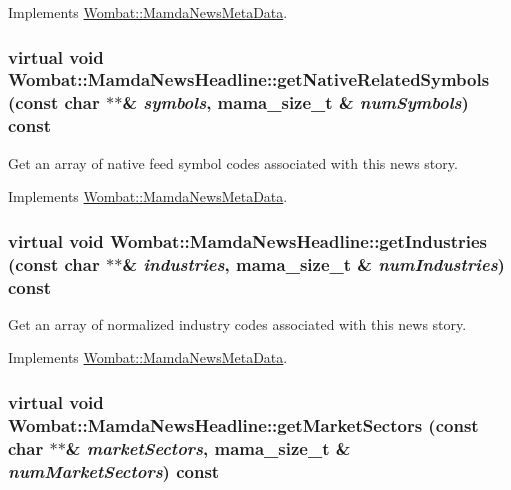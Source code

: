 Implements \hyperlink{classWombat_1_1MamdaNewsMetaData_2eee46712fbf04831baf811695678aeb}{Wombat::Mamda\-News\-Meta\-Data}.\hypertarget{classWombat_1_1MamdaNewsHeadline_35caf4a0f9aa24db2903ae45042200c1}{
\subsubsection[getNativeRelatedSymbols]{\setlength{\rightskip}{0pt plus 5cm}virtual void Wombat::Mamda\-News\-Headline::get\-Native\-Related\-Symbols (const char $\ast$$\ast$\& {\em symbols}, mama\_\-size\_\-t \& {\em num\-Symbols}) const}}
\label{classWombat_1_1MamdaNewsHeadline_35caf4a0f9aa24db2903ae45042200c1}


Get an array of native feed symbol codes associated with this news story. 



Implements \hyperlink{classWombat_1_1MamdaNewsMetaData_64e79bec2fd98b5669ea62bb9c51fec2}{Wombat::Mamda\-News\-Meta\-Data}.\hypertarget{classWombat_1_1MamdaNewsHeadline_6dd281e1212cf8a7efca3da2aec7d020}{
\subsubsection[getIndustries]{\setlength{\rightskip}{0pt plus 5cm}virtual void Wombat::Mamda\-News\-Headline::get\-Industries (const char $\ast$$\ast$\& {\em industries}, mama\_\-size\_\-t \& {\em num\-Industries}) const}}
\label{classWombat_1_1MamdaNewsHeadline_6dd281e1212cf8a7efca3da2aec7d020}


Get an array of normalized industry codes associated with this news story. 



Implements \hyperlink{classWombat_1_1MamdaNewsMetaData_dd73f4b456cf4c7720d3ba86e4d71a4c}{Wombat::Mamda\-News\-Meta\-Data}.\hypertarget{classWombat_1_1MamdaNewsHeadline_c060c9e66c0fb02c4039f1ca5c14502c}{
\subsubsection[getMarketSectors]{\setlength{\rightskip}{0pt plus 5cm}virtual void Wombat::Mamda\-News\-Headline::get\-Market\-Sectors (const char $\ast$$\ast$\& {\em market\-Sectors}, mama\_\-size\_\-t \& {\em num\-Market\-Sectors}) const}}
\label{classWombat_1_1MamdaNewsHeadline_c060c9e66c0fb02c4039f1ca5c14502c}


